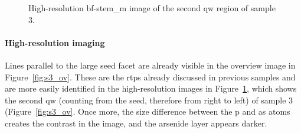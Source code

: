 \begin{figure}
    \centering
    \caption{High-resolution \acs{bf}-\acs{stem_m} image of the second \acl{qw} region of sample 3.}
    \label{fig:s3_QW_HR}
\end{figure}

\paragraph{High-resolution imaging} Lines parallel to the large  seed facet are already visible in the overview image in Figure~\ref{fig:s3_ov}. These are the \acl{rtp}s already discussed in previous samples and are more easily identified in the high-resolution images in Figure~\ref{fig:s3_QW_HR}, which shows the second \acl{qw} (counting from the seed, therefore from right to left) of sample 3 (Figure~\ref{fig:s3_ov}. Once more, the size difference between the \acl{p} and \acl{as} atoms creates the contrast in the image, and the arsenide layer appears darker.
\par

